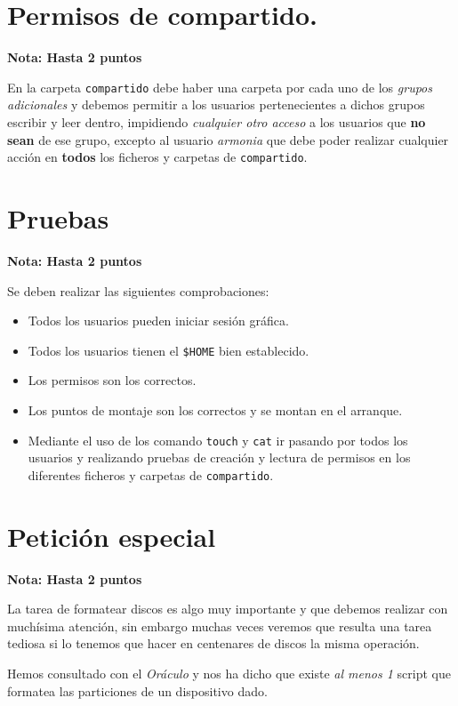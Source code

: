 \documentclass[11pt]{article}
\begin{document}
\section{Permisos de compartido.}
\label{sec-6}

\textbf{Nota: Hasta 2 puntos}

En la carpeta \verb~compartido~ debe haber una carpeta por cada uno de los \emph{grupos
adicionales} y debemos permitir a los usuarios pertenecientes a dichos grupos
escribir y leer dentro, impidiendo \emph{cualquier otro acceso} a los usuarios que
\textbf{no sean} de ese grupo, excepto al usuario \emph{armonia} que debe poder realizar
cualquier acción en \textbf{todos} los ficheros y carpetas de \verb~compartido~.

\section{Pruebas}
\label{sec-7}

\textbf{Nota: Hasta 2 puntos}

Se deben realizar las siguientes comprobaciones:

\begin{itemize}
\item Todos los usuarios pueden iniciar sesión gráfica.
\item Todos los usuarios tienen el \verb~$HOME~ bien establecido.
\item Los permisos son los correctos.
\item Los puntos de montaje son los correctos y se montan en el arranque.
\item Mediante el uso de los comando \verb~touch~ y \verb~cat~ ir pasando por todos los usuarios y
realizando pruebas de creación y lectura de permisos en los diferentes
ficheros y carpetas de \verb~compartido~.
\end{itemize}


\section{Petición especial}
\label{sec-8}

\textbf{Nota: Hasta 2 puntos}

La tarea de formatear discos es algo muy importante y que debemos realizar con
muchísima atención, sin embargo muchas veces veremos que resulta una tarea
tediosa si lo tenemos que hacer en centenares de discos la misma
operación. 

Hemos consultado con el \emph{Oráculo} y nos ha dicho que existe \emph{al menos 1}
script que formatea las particiones de un dispositivo dado.
\end{document}
